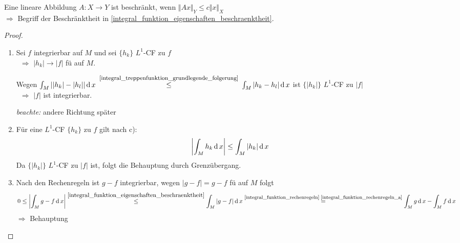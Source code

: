 \begin{underlinedenvironment}[Hinweis]
	Eine lineare Abbildung $A:X\to Y$ ist beschränkt, wenn $\Vert Ax\Vert_Y \le c\Vert x \Vert _X$ \\
	$\Rightarrow$ Begriff der Beschränktheit in \ref{integral_funktion_eigenschaften_beschraenktheit}.
\end{underlinedenvironment}
\begin{proof}\hspace*{0pt}
	\NoEndMark
	\begin{enumerate}[label={zu \alph*)},topsep=\dimexpr -\baselineskip / 2\relax,leftmargin=\widthof{\texttt{zu b)\ }}]
		\item Sei $f$ integrierbar auf $M$ und sei $\{ h_k \}$ $L^1$-CF zu $f$ \\
		\ $\Rightarrow$ $\vert h_k \vert\to \vert f \vert$ \gls{fü} auf $M$.
		
		Wegen $\int_M \left\vert \vert h_k \vert - \vert h_l \vert\right\vert \operatorname{d} x$ $\overset{\footnotesize\cref{integral_treppenfunktion_grundlegende_folgerung}}{\le}$ $\int_M \vert h_k - h_l \vert \operatorname{d} x$ ist $\{ \vert h_k\vert \}$ $L^1$-CF zu $\vert f \vert$ \\
		\ $\Rightarrow$ $\vert f \vert$ ist integrierbar.
		
		\emph{beachte:} andere Richtung später
		
		\item Für eine $L^1$-CF $\{ h_k\}$ zu $f$ gilt nach  c): \begin{align*}
			\left\vert \int_M h_k \operatorname{d} x \right\vert \le \int_M \vert h_k\vert \operatorname{d} x
		\end{align*}
		Da $\{ \vert h_k \vert \}$ $L^1$-CF zu $\vert f \vert$ ist, folgt die Behauptung durch Grenzübergang.
		
		\item Nach den Rechenregeln ist $g - f$ integrierbar, wegen $\vert g - f\vert = g - f$ \gls{fü} auf $M$ folgt \begin{align*}
			0 \le \left\vert \int_M g - f\D x\right\vert\overset{\ref{integral_funktion_eigenschaften_beschraenktheit}}{\le} \int_M \vert g - f\vert \D x \overset{\footnotesize \cref{integral_funktion_rechenregeln}\;\ref{integral_funktion_rechenregeln_a}}{=} \int_M g \D x - \int_M f \D x
		\end{align*}
		$\Rightarrow$ Behauptung
		

\end{enumerate}
\end{proof}
